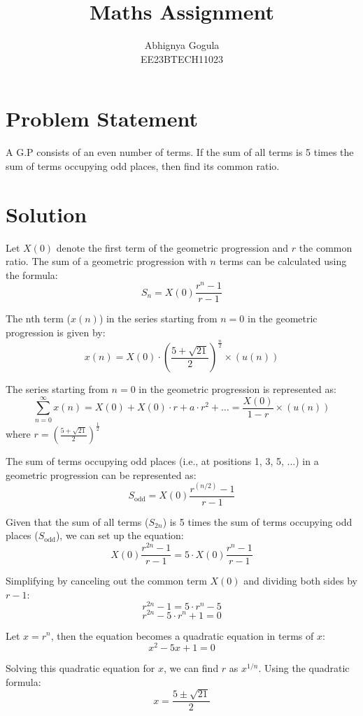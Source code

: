 \documentclass{article}
\begin{document}
\title{Maths Assignment}
\author{Abhignya Gogula\\
        EE23BTECH11023}
\maketitle

\section*{Problem Statement}
A G.P consists of an even number of terms. If the sum of all terms is 5 times the sum of terms occupying odd places, then find its common ratio.

\section*{Solution}
Let \( X(0) \) denote the first term of the geometric progression and \( r \) the common ratio. The sum of a geometric progression with \( n \) terms can be calculated using the formula:
\[ S_n = X(0) \frac{{r^n - 1}}{{r - 1}} \]

The nth term (\(x(n)\)) in the series starting from \(n = 0\) in the geometric progression is given by:
\[ x(n) = X(0) \cdot \left(\frac{{5 + \sqrt{21}}}{2}\right)^{\frac{n}{2}} \times (u(n))\]

The series starting from \(n = 0\) in the geometric progression is represented as:
\[ \sum_{n=0}^{\infty} x(n) = X(0) + X(0) \cdot r + a \cdot r^2 + \dots = \frac{X(0)}{1 - r} \times (u(n))\]
where \( r = \left(\frac{{5 + \sqrt{21}}}{2}\right)^{\frac{1}{2}} \)

The sum of terms occupying odd places (i.e., at positions 1, 3, 5, ...) in a geometric progression can be represented as:
\[ S_{\text{odd}} = X(0) \frac{{r^{(n/2)} - 1}}{{r - 1}} \]

Given that the sum of all terms (\( S_{2n} \)) is 5 times the sum of terms occupying odd places (\( S_{\text{odd}} \)), we can set up the equation:
\[ X(0) \frac{{r^{2n} - 1}}{{r - 1}} = 5 \cdot X(0) \frac{{r^n - 1}}{{r - 1}} \]

Simplifying by canceling out the common term \( X(0) \) and dividing both sides by \( r - 1 \):
\[ r^{2n} - 1 = 5 \cdot r^n - 5 \]
\[ r^{2n} - 5 \cdot r^n + 1 = 0 \]

Let \( x = r^n \), then the equation becomes a quadratic equation in terms of \( x \):
\[ x^2 - 5x + 1 = 0 \]

Solving this quadratic equation for \( x \), we can find \( r \) as \( x^{1/n} \). Using the quadratic formula:
\[ x = \frac{{5 \pm \sqrt{21}}}{2} \]
\end{document}
